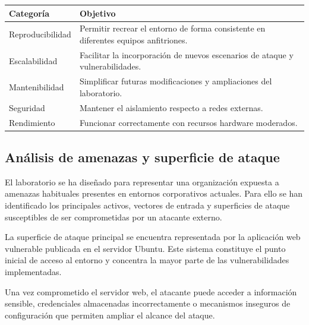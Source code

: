 \begin{table}[h]
    \centering

    \setlength{\arrayrulewidth}{0.05mm}

    \begin{tabular}{|C{4cm}|C{9cm}|}
        \hline
        \textbf{Categoría} & \textbf{Objetivo} \\
        \hline
        Reproducibilidad & Permitir recrear el entorno de forma consistente en diferentes equipos anfitriones. \\
        \hline
        Escalabilidad & Facilitar la incorporación de nuevos escenarios de ataque y vulnerabilidades. \\
        \hline
        Mantenibilidad & Simplificar futuras modificaciones y ampliaciones del laboratorio. \\
        \hline
        Seguridad & Mantener el aislamiento respecto a redes externas. \\
        \hline
        Rendimiento & Funcionar correctamente con recursos hardware moderados. \\
        \hline
    \end{tabular}

    \renewcommand{\arraystretch}{1}
    \label{tab:requisitos_no_funcionales}
\end{table}
\vspace{0.5cm}

\subsection{Análisis de amenazas y superficie de ataque}

El laboratorio se ha diseñado para representar una organización expuesta a amenazas habituales presentes en entornos corporativos actuales. Para ello se han identificado los principales activos, vectores de entrada y superficies de ataque susceptibles de ser comprometidas por un atacante externo.

La superficie de ataque principal se encuentra representada por la aplicación web vulnerable publicada en el servidor Ubuntu. Este sistema constituye el punto inicial de acceso al entorno y concentra la mayor parte de las vulnerabilidades implementadas.

Una vez comprometido el servidor web, el atacante puede acceder a información sensible, credenciales almacenadas incorrectamente o mecanismos inseguros de configuración que permiten ampliar el alcance del ataque.

